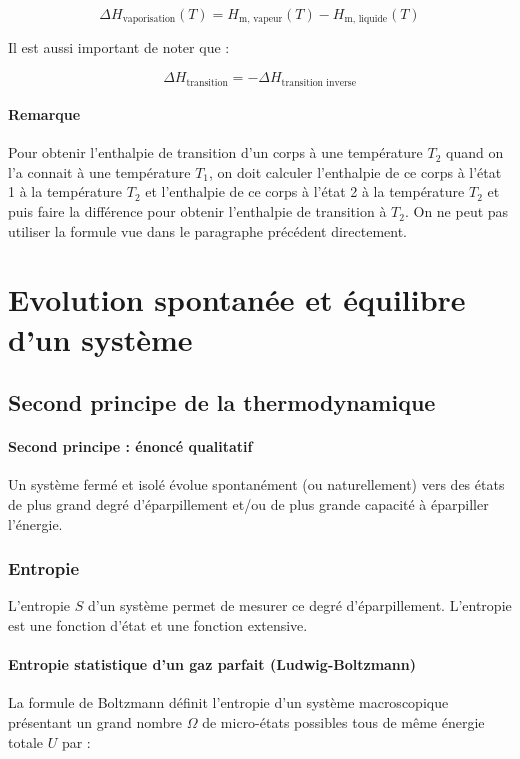 $$\Delta H_{\text{vaporisation}}(T) = H_{\text{m, vapeur}}(T) - 
H_{\text{m, liquide}}(T)$$

Il est aussi important de noter que :

$$\Delta H_{\text{transition}} = -\Delta H_{\text{transition inverse}}$$

\paragraph{Remarque}
Pour obtenir l'enthalpie de transition d'un corps à une température $T_2$
quand on l'a connait à une température $T_1$, on doit calculer
l'enthalpie de ce corps à l'état 1 à la température $T_2$
et l'enthalpie de ce corps à l'état 2 à la température $T_2$
et puis faire la différence pour obtenir l'enthalpie de transition
à $T_2$. On ne peut pas utiliser la formule vue dans le paragraphe 
précédent directement.

\section{Evolution spontanée et équilibre d'un système}

\subsection{Second principe de la thermodynamique}

\paragraph{Second principe : énoncé qualitatif}
Un système fermé et isolé évolue spontanément (ou naturellement)
vers des états de plus grand degré d'éparpillement et/ou de
plus grande capacité à éparpiller l'énergie.

\subsubsection{Entropie}
L'entropie $S$ d'un système permet de mesurer ce degré d'éparpillement.
L'entropie est une fonction d'état et une fonction extensive.

\paragraph{Entropie statistique d'un gaz parfait (Ludwig-Boltzmann)} 
La formule de Boltzmann définit l'entropie d'un système
macroscopique présentant un grand nombre $\Omega$ de micro-états
possibles tous de même énergie totale $U$ par :

